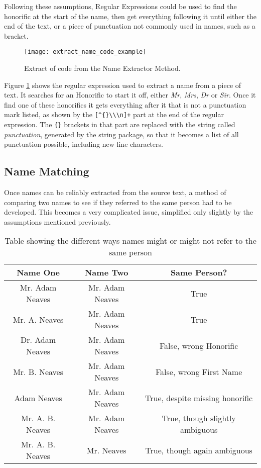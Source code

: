 Following these assumptions, Regular Expressions could be used to find the honorific at the start of the name, then get everything following it until either the end of the text, or a piece of punctuation not commonly used in names, such as a bracket.
\begin{figure}[ht]
\texttt{[image: extract\_name\_code\_example]}
\caption{Extract of code from the Name Extractor Method.}
\label{fig:name_extract_code}
\end{figure}

Figure \ref{fig:name_extract_code} shows the regular expression used to extract a name from a piece of text. It searches for an Honorific to start it off, either \emph{Mr}, \emph{Mrs}, \emph{Dr} or \emph{Sir}. Once it find one of these honorifics it gets everything after it that is not a punctuation mark listed, as shown by the \verb|[^{}\\\n]+| part at the end of the regular expression. The \verb|{}| brackets in that part are replaced with the string called \emph{punctuation}, generated by the string package, so that it becomes a list of all punctuation possible, including new line characters.  

\subsection{Name Matching}
\label{sec:imp_name_match}
Once names can be reliably extracted from the source text, a method of comparing two names to see if they referred to the same person had to be developed. This becomes a very complicated issue, simplified only slightly by the assumptions mentioned previously.

\begin{table}[ht!]
\centering
\begin{tabular}{|c c c|}
Name One & Name Two & Same Person? \\
\hline
Mr. Adam Neaves  & Mr. Adam Neaves & True \\
Mr. A. Neaves    & Mr. Adam Neaves & True \\
Dr. Adam Neaves  & Mr. Adam Neaves & False, wrong Honorific \\
Mr. B. Neaves    & Mr. Adam Neaves & False, wrong First Name \\
Adam Neaves      & Mr. Adam Neaves & True, despite missing honorific \\
Mr. A. B. Neaves & Mr. Adam Neaves & True, though slightly ambiguous \\
Mr. A. B. Neaves & Mr. Neaves      & True, though again ambiguous    \\
\end{tabular}
\caption{Table showing the different ways names might or might not refer to the same person}
\label{tbl:name_match}
\end{table}

